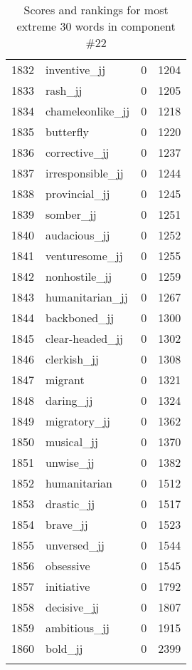 \begin{longtable}[!htbp]{| rlr@{.}l |}
    1832 & inventive\_jj & 0 & 1204 \\
    1833 & rash\_jj & 0 & 1205 \\
    1834 & chameleonlike\_jj & 0 & 1218 \\
    1835 & butterfly & 0 & 1220 \\
    1836 & corrective\_jj & 0 & 1237 \\
    1837 & irresponsible\_jj & 0 & 1244 \\
    1838 & provincial\_jj & 0 & 1245 \\
    1839 & somber\_jj & 0 & 1251 \\
    1840 & audacious\_jj & 0 & 1252 \\
    1841 & venturesome\_jj & 0 & 1255 \\
    1842 & nonhostile\_jj & 0 & 1259 \\
    1843 & humanitarian\_jj & 0 & 1267 \\
    1844 & backboned\_jj & 0 & 1300 \\
    1845 & clear-headed\_jj & 0 & 1302 \\
    1846 & clerkish\_jj & 0 & 1308 \\
    1847 & migrant & 0 & 1321 \\
    1848 & daring\_jj & 0 & 1324 \\
    1849 & migratory\_jj & 0 & 1362 \\
    1850 & musical\_jj & 0 & 1370 \\
    1851 & unwise\_jj & 0 & 1382 \\
    1852 & humanitarian & 0 & 1512 \\
    1853 & drastic\_jj & 0 & 1517 \\
    1854 & brave\_jj & 0 & 1523 \\
    1855 & unversed\_jj & 0 & 1544 \\
    1856 & obsessive & 0 & 1545 \\
    1857 & initiative & 0 & 1792 \\
    1858 & decisive\_jj & 0 & 1807 \\
    1859 & ambitious\_jj & 0 & 1915 \\
    1860 & bold\_jj & 0 & 2399 \\
    \hline
    \caption{Scores and rankings for most extreme 30 words in component \#22} \\
\end{longtable}
